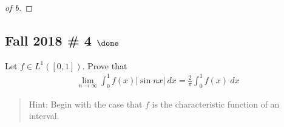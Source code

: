 \begin{solution}
\begin{proof}[of b]
\end{proof}

\end{solution}

\hypertarget{fall-2018-4-done}{%
\subsection{\texorpdfstring{Fall 2018 \# 4
\(\done\)}{Fall 2018 \# 4 \textbackslash done}}\label{fall-2018-4-done}}

Let \(f\in L^1([0, 1])\). Prove that
\begin{align*}
\lim_{n \to \infty} \int_{0}^{1} f(x) {\left\lvert {\sin n x} \right\rvert} ~d x= \frac{2}{\pi} \int_{0}^{1} f(x) ~d x
\end{align*}

\begin{quote}
Hint: Begin with the case that \(f\) is the characteristic function of
an interval.
\end{quote}


